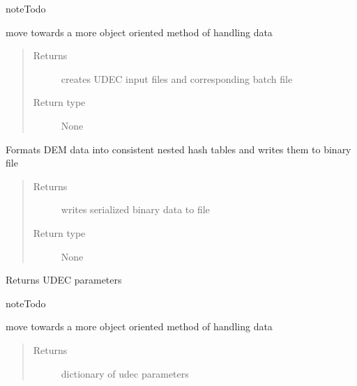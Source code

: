 \documentclass[letterpaper,10pt,english]{sphinxmanual}
\begin{document}
\begin{fulllineitems}
\begin{fulllineitems}
\begin{sphinxadmonition}{note}{Todo}

move towards a  more object oriented method of handling data
\end{sphinxadmonition}
\begin{quote}\begin{description}
\item[{Returns}] \leavevmode
creates UDEC input files and corresponding batch file

\item[{Return type}] \leavevmode
None

\end{description}\end{quote}

\end{fulllineitems}


\begin{fulllineitems}
\label{\detokenize{MouseReferenceManual:Modules.Module_UDEC.Module_UDEC.formatOutput}}
Formats DEM data into consistent nested hash tables and writes them to binary file
\begin{quote}\begin{description}
\item[{Returns}] \leavevmode
writes serialized binary data to file

\item[{Return type}] \leavevmode
None

\end{description}\end{quote}

\end{fulllineitems}


\begin{fulllineitems}
\label{\detokenize{MouseReferenceManual:Modules.Module_UDEC.Module_UDEC.getUDECParameters}}
Returns UDEC parameters

\begin{sphinxadmonition}{note}{Todo}

move towards a  more object oriented method of handling data
\end{sphinxadmonition}
\begin{quote}\begin{description}
\item[{Returns}] \leavevmode
dictionary of udec parameters


\end{description}
\end{quote}
\end{fulllineitems}
\end{fulllineitems}
\end{document}

